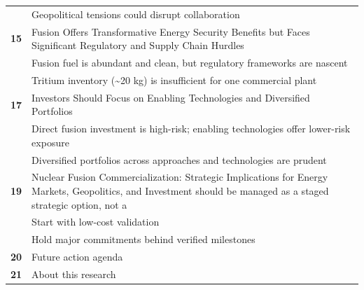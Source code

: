 \documentclass[10pt,a4paper]{article}
\begin{document}
\begin{tabularx}{\linewidth}{p{14mm}Y}
 & {\scriptsize\color{BOMuted} Geopolitical tensions could disrupt collaboration} \\[1pt]
\textcolor{BOGreen}{\bfseries 15} & Fusion Offers Transformative Energy Security Benefits but Faces Significant Regulatory and Supply Chain Hurdles \\[5pt]
 & {\scriptsize\color{BOMuted} Fusion fuel is abundant and clean, but regulatory frameworks are nascent} \\[1pt]
 & {\scriptsize\color{BOMuted} Tritium inventory (\textasciitilde{}20 kg) is insufficient for one commercial plant} \\[1pt]
\textcolor{BOGreen}{\bfseries 17} & Investors Should Focus on Enabling Technologies and Diversified Portfolios \\[5pt]
 & {\scriptsize\color{BOMuted} Direct fusion investment is high-risk; enabling technologies offer lower-risk exposure} \\[1pt]
 & {\scriptsize\color{BOMuted} Diversified portfolios across approaches and technologies are prudent} \\[1pt]
\textcolor{BOGreen}{\bfseries 19} & Nuclear Fusion Commercialization: Strategic Implications for Energy Markets, Geopolitics, and Investment should be managed as a staged strategic option, not a \\[5pt]
 & {\scriptsize\color{BOMuted} Start with low-cost validation} \\[1pt]
 & {\scriptsize\color{BOMuted} Hold major commitments behind verified milestones} \\[1pt]
\textcolor{BOGreen}{\bfseries 20} & Future action agenda \\[5pt]
\textcolor{BOGreen}{\bfseries 21} & About this research \\[5pt]
\end{tabularx}
\clearpage
\end{document}
